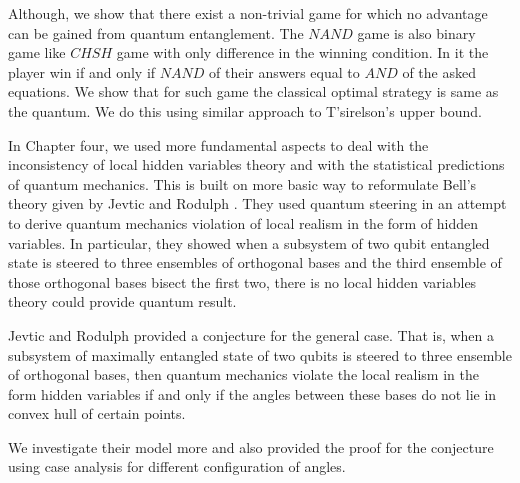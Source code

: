 Although, we show that there exist a non-trivial game for which no advantage can be gained from quantum entanglement. 
The $NAND$ game is also binary game like $CHSH$ game with only difference in the winning condition. In it the player win if and only if  $NAND$ of their answers equal to $AND$ of the asked equations. We show that for such game the classical optimal strategy is same as the quantum. We do this using similar approach to T'sirelson's upper bound.



%
%
%

In Chapter four, we used more fundamental aspects to deal with the inconsistency of local hidden variables theory and with the statistical predictions of quantum mechanics.
This is built on more basic way to reformulate Bell's theory given by  Jevtic and Rodulph \citep*{Jevtic:2015:10.1364/JOSAB.32.000A50}. They used quantum steering  in an attempt to derive  quantum mechanics  violation of local realism in the form of hidden variables. 
In particular, they showed when a subsystem of two qubit entangled state is steered to three ensembles of orthogonal  bases and the third  ensemble of those orthogonal bases bisect the first two, there is no local hidden variables theory could  provide quantum result.

Jevtic and Rodulph  provided a conjecture for the general case. That is, when a subsystem of maximally entangled state of two qubits is steered to three ensemble of orthogonal bases, then quantum mechanics violate the local realism in the form hidden variables if and  only if the angles between these bases do not lie in convex hull of certain points. 

We investigate their model more and also provided the proof for the conjecture using case analysis for different configuration of angles. 


